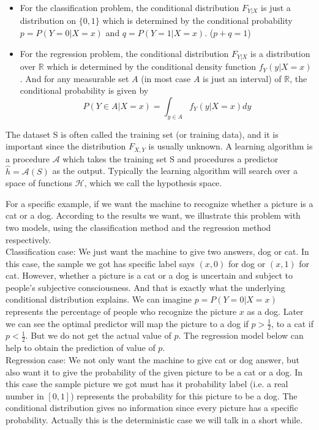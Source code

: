 \begin{itemize}
	\item  For the classification problem, the conditional distribution $F_{Y|X}$ is just a distribution on $\{0,1\}$ which is determined by the conditional probability $p=P(Y=0|X=x)$ and $q=P(Y=1|X=x)$. ($p+q=1$)
	\item  For the regression problem, the conditional distribution $F_{Y|X}$ is a distribution over $\mathbb{R}$ which is determined by the conditional density function $f_Y(y|X=x)$. And for any measurable set $A$ (in most case $A$ is just an interval) of $\mathbb{R}$, the conditional probability is given by 
	$$P(Y \in A|X=x)= \int_{y\in A}f_Y(y|X=x)dy$$
\end{itemize}

\noindent The dataset S is often called the training set (or training data), and it is important since the distribution $F_{X,Y}$ is usually unknown. A learning algorithm is a procedure $\mathcal{A}$ which takes the training set S and procedures a predictor $\hat{h}=\mathcal{A}(S)$ as the output. Typically the learning algorithm will search over a space of functions $\mathcal{H}$, which we call the hypothesis space.\\
\begin{example}
	For a specific example, if we want the machine to recognize whether a picture is a cat or a dog.
	According to the results we want, we illustrate this problem with two models, using the classification method and the regression method respectively.\\
	
	Classification case: We just want the machine to give two answers, dog or cat. In this case, the sample we got has specific label says $(x,0)$ for dog or $(x,1)$ for cat. However, whether a picture is a cat or a dog is uncertain and subject to people's subjective consciousness. And that is exactly what the underlying conditional distribution explains. We can imagine $p=P(Y=0|X=x)$ represents the percentage of people who recognize the picture $x$ as a dog. Later we can see the optimal predictor will map the picture to a dog if $p>\frac{1}{2}$, to a cat if $p<\frac{1}{2}$. But we do not get the actual value of $p$. The regression model below can help to obtain the prediction of value of $p$.\\
	
	Regression case: We not only want the machine to give cat or dog answer, but also want it to give the probability of the given picture to be a cat or a dog. In this case the sample picture we got must has it probability label (i.e. a real number in $[0,1]$) represents the probability for this picture to be a dog. The conditional distribution gives no information since every picture has a specific probability. Actually this is the deterministic case we will talk in a short while.
\end{example}
